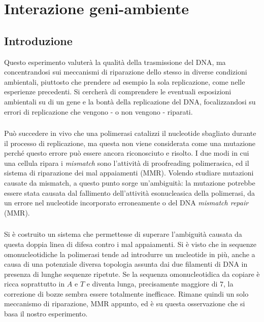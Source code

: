 \section*{Interazione geni-ambiente}
 \subsection{Introduzione}
 Questo esperimento valuterà la qualità della trasmissione del DNA, ma concentrandosi sui meccanismi di riparazione dello stesso in diverse condizioni ambientali, piuttosto che prendere ad esempio la sola replicazione, come nelle esperienze precedenti. Si cercherà di comprendere le eventuali esposizioni ambientali su di un gene e la bontà della replicazione del DNA, focalizzandosi su errori di replicazione che vengono - o non vengono - riparati. 
 
 \subsubsection{}
 Può succedere in vivo che una polimerasi catalizzi il nucleotide sbagliato durante il processo di replicazione, ma questa non viene considerata come una mutazione perché questo errore può essere ancora riconosciuto e risolto. I due modi in cui una cellula ripara i \textit{mismatch} sono l'attività di proofreading polimerasica, ed il sistema di riparazione dei mal appaiamenti (MMR). Volendo studiare mutazioni causate da mismatch, a questo punto sorge un'ambiguità: la mutazione potrebbe essere stata causata dal fallimento dell'attività esonucleasica della polimerasi, da un errore nel nucleotide incorporato erroneamente o del DNA \textit{mismatch repair} (MMR). 
 
 \subsubsection{}
 Si è costruito un sistema che permettesse di superare l'ambiguità causata da questa doppia linea di difesa contro i mal appaiamenti. Si è visto che in sequenze omonucleotidiche la polimerasi tende ad introdurre un nucleotide in più, anche a causa di una potenziale diversa topologia assunta dai due filamenti di DNA in presenza di lunghe sequenze ripetute. Se la sequenza omonucleotidica da copiare è ricca soprattutto in $A$ e $T$ e diventa lunga, precisamente maggiore di $7$, la correzione di bozze sembra essere totalmente inefficace. Rimane quindi un solo meccanismo di riparazione, MMR appunto, ed è su questa osservazione che si basa il nostro esperimento. 
 
